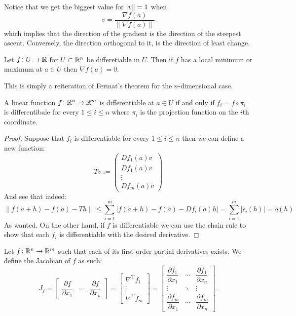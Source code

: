 \documentclass[11pt,a4paper]{article}
\begin{document}
\begin{remark}
  Notice that we get the biggest value for $\norm{v} = 1$ when
  \[
    v = \frac{\nabla f(a)}{\|\nabla f(a)\|}
  \]
  which implies that the direction
  of the gradient is the direction of the steepest ascent. Conversely,
  the direction orthogonal to it, is the direction of least change.
\end{remark}

\begin{proposition}
  Let $f \colon U \to \mathbb{R}$ for $U \subset \mathbb{R}^n$ be differetiable in $U$.
  Then if $f$ has a local minimum or maximum at $a \in U$ then
  $\nabla f(a) = 0$.
\end{proposition}

\begin{remark}
  This is simply a reiteration of Fermat's theorem for the $n$-dimensional
  case.
\end{remark}

\begin{proposition}
  A linear function $f \colon \mathbb{R}^n \to \mathbb{R}^m$ is differentiable at 
  $a \in U$ if and only if $f_i = f \circ \pi_i$ is differentibale 
  for every $1 \le i \le n$ where $\pi_i$ is the projection function 
  on the $i$th coordinate.
\end{proposition}
\begin{proof}
  Suppose that $f_i$ is differentiable for every $1 \le i \le n$ then
  we can define a new function:
  \[
    Tv := \begin{pmatrix}Df_1(a)v \\ Df_1(a)v \\ 
    \vdots \\ Df_m(a)v \end{pmatrix}
  \]
  And see that indeed:
  \[
    \|f(a + h) - f(a) - Th\| \le 
    \sum_{i=1}^{m}|f(a + h) - f(a) - Df_i(a)h| = 
    \sum_{i=1}^{m}|\epsilon_i(h)| = o(h)
  \]
  As wanted. On the other hand, if $f$ is differentiable we can use
  the chain rule to show that each $f_i$ is differentiable with the
  desired derivative.
\end{proof}
\begin{definition}[Jacobian]
  Let $f \colon \mathbb{R}^n \to \mathbb{R}^m$ such that each of its first-order partial 
  derivatives exists. We define the Jacobian of $f$ as such:
  \[
    {J_{f}} ={\begin{bmatrix}{\dfrac {\partial {f} }
    {\partial x_{1}}}&\cdots &{\dfrac {\partial {f} }{\partial 
    x_{n}}}\end{bmatrix}}={\begin{bmatrix}\nabla ^{\mathrm {T} }f_{1}\\
    \vdots \\\nabla ^{\mathrm {T} }f_{m}\end{bmatrix}}={\begin{bmatrix}
    {\dfrac {\partial f_{1}}{\partial x_{1}}}&\cdots &{\dfrac {\partial 
    f_{1}}{\partial x_{n}}}\\\vdots &\ddots &\vdots \\{\dfrac {\partial 
    f_{m}}{\partial x_{1}}}&\cdots &{\dfrac {\partial f_{m}}{\partial 
    x_{n}}}\end{bmatrix}}.
  \]
\end{definition}
\end{document}
